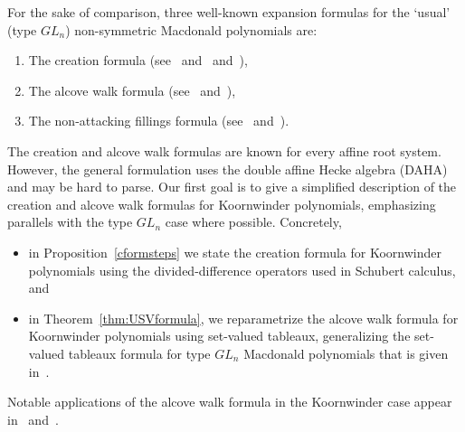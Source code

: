 \documentclass[11pt]{article}
\theoremstyle{plain}
\theoremstyle{definition}
\theoremstyle{remark}
\numberwithin{equation}{section}
\newcounter{r}
\newcounter{s}
\begin{document}
For the sake of comparison, three well-known expansion formulas for the `usual' (type $GL_n$) non-symmetric Macdonald polynomials are:

\begin{enumerate}
\item[(a)] The creation formula (see~\cite[(5.6)]{Ch96} and~\cite[(5.10.13)]{Mac03} and~\cite[(3.11)]{CR24}),
\item[(b)] The alcove walk formula (see~\cite[Theorem 3.1]{RY08} and~\cite[Theorem 1.1]{GR21}),
\item[(c)] The non-attacking fillings formula (see~\cite[Theorem 3.5.1]{HHL06} and~\cite[Theorem 1.1]{GR21}).
\end{enumerate}
The creation and alcove walk formulas are known for every affine root system.  
However, the general formulation uses the double affine Hecke algebra (DAHA) and may be hard to parse.  
Our first goal is to give a simplified description of the creation and alcove walk formulas for Koornwinder polynomials, emphasizing parallels with the type $GL_n$ case where possible.  
Concretely,
\begin{itemize}
\item in Proposition~\ref{cformsteps} we state the creation formula for Koornwinder polynomials using the divided-difference operators used in Schubert calculus,
and 
\item in Theorem~\ref{thm:USVformula}, we reparametrize the alcove walk formula for Koornwinder polynomials using set-valued tableaux, generalizing the set-valued tableaux formula for type $GL_n$ Macdonald polynomials that is given in~\cite{DR22}.
\end{itemize}
Notable applications of the alcove walk formula in the Koornwinder case appear in~\cite{OS13} and~\cite{Yam23}.
\end{document}
